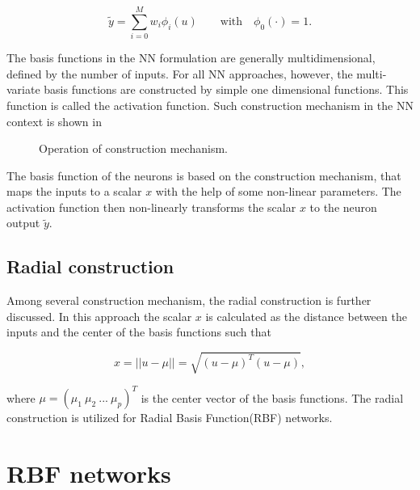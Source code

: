  \begin{equation}
\label{basis_NN_eq_lin_bias}
\tilde{y} = \sum_{i = 0}^M w_i \phi_i(u) \qquad \text{with} \quad \phi_0(\cdot) = 1.
\end{equation}

The basis functions in the NN formulation are generally multidimensional, defined by the number of inputs. For all NN approaches, however, the multi-variate basis functions are constructed by simple one dimensional functions\cite{nelles2013nonlinear}. This function is called the activation function. Such construction mechanism in the NN context is shown in 

\begin{figure}[H]
\centering
 
\caption{Operation of construction mechanism.}
\label{fig:activation_mechanism}
\end{figure}

\vspace{-3mm}

The basis function of the neurons is based on the construction mechanism, that maps the inputs to a scalar $x$ with the help of some non-linear parameters. The activation function then non-linearly transforms the scalar $x$ to the neuron output $\tilde{y}$. 

\subsection{Radial construction}
\label{radial construction}

Among several construction mechanism, the radial construction is further discussed. In this approach the scalar $x$ is calculated as the distance between the inputs and the center of the basis functions such that 

 \begin{equation}
\label{radial_structure}
x = ||u- \mu|| = \sqrt{(u-\mu)^T (u-\mu)},
\end{equation}

where $\mu = (\mu_1 \ \mu_2 \ ... \ \mu_p)^T$ is the center vector of the basis functions. The radial construction is utilized for Radial Basis Function(RBF) networks.


\section{RBF networks}
\label{Radial_basis_function_networks}


